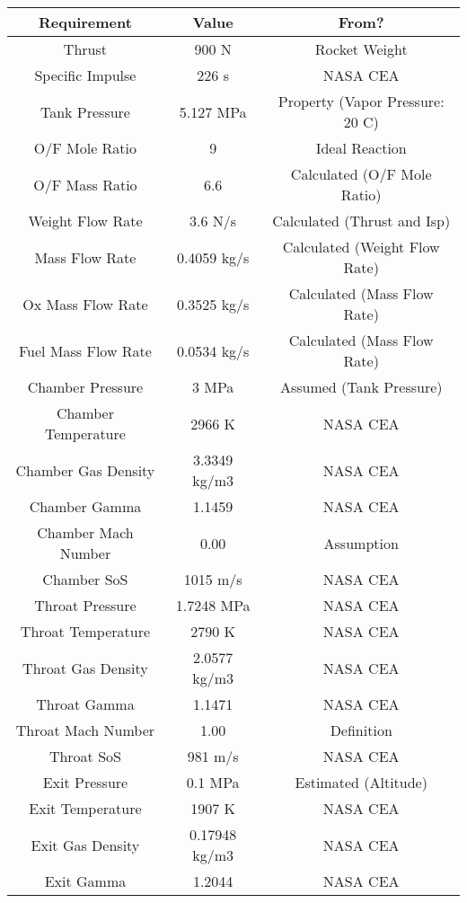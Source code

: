 \documentclass[12pt, letter paper]{article}
\begin{document}
	\begin{center}
		\begin{tabular}{|c |c |c |}
			\hline
			\textbf{Requirement} & \textbf{Value} & \textbf{From?} \\ \hline
			Thrust & 900 N & Rocket Weight \\ \hline
			Specific Impulse & 226 s & NASA CEA \\ \hline
			Tank Pressure & 5.127 MPa & Property (Vapor Pressure: 20 C) \\ \hline
			O/F Mole Ratio & 9 & Ideal Reaction \\ \hline
			O/F Mass Ratio & 6.6 & Calculated (O/F Mole Ratio) \\ \hline 
			Weight Flow Rate & 3.6 N/s & Calculated (Thrust and Isp)\\ \hline
			Mass Flow Rate & 0.4059 kg/s & Calculated (Weight Flow Rate) \\ \hline
			Ox Mass Flow Rate & 0.3525 kg/s & Calculated (Mass Flow Rate) \\ \hline
			Fuel Mass Flow Rate & 0.0534 kg/s & Calculated (Mass Flow Rate) \\ \hline
			Chamber Pressure & 3 MPa & Assumed (Tank Pressure) \\ \hline
			Chamber Temperature & 2966 K & NASA CEA \\ \hline
			Chamber Gas Density & 3.3349 kg/m3 & NASA CEA \\ \hline
			Chamber Gamma & 1.1459 & NASA CEA \\ \hline
			Chamber Mach Number & 0.00 & Assumption \\ \hline
			Chamber SoS & 1015 m/s & NASA CEA \\ \hline
			Throat Pressure & 1.7248 MPa & NASA CEA \\ \hline
			Throat Temperature & 2790 K & NASA CEA \\ \hline
			Throat Gas Density & 2.0577 kg/m3 & NASA CEA \\ \hline
			Throat Gamma & 1.1471 & NASA CEA \\ \hline
			Throat Mach Number & 1.00 & Definition \\ \hline
			Throat SoS & 981 m/s & NASA CEA \\ \hline
			Exit Pressure & 0.1 MPa & Estimated (Altitude) \\ \hline
			Exit Temperature & 1907 K & NASA CEA \\ \hline
			Exit Gas Density & 0.17948 kg/m3 & NASA CEA \\ \hline
			Exit Gamma & 1.2044 & NASA CEA \\ \hline

\end{tabular}
\end{center}
\end{document}
